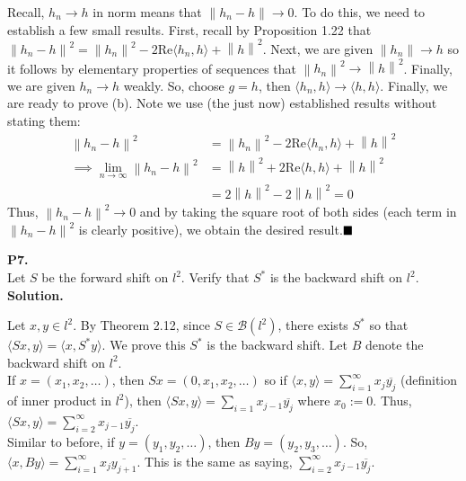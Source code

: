 \documentclass{article}
\newcommand{\norm}[1]{\left\lVert#1\right\rVert}
\begin{document}
    Recall, $h_n\to h$ in norm means that $\norm{h_n-h}\to 0$. To do this, we need to establish a few small results. First, recall
    by Proposition 1.22 that $\norm{h_n-h}^2 = \norm{h_n}^2 - 2\text{Re}\langle h_n,h\rangle + \norm{h}^2$. Next,
    we are given $\norm{h_n} \to h$ so it follows by elementary properties of sequences that $\norm{h_n}^2 \to \norm{h}^2$.
    Finally, we are given $h_n\to h$ weakly. So, choose $g = h$, then $\langle h_n,h\rangle \to \langle h,h\rangle$. Finally,
    we are ready to prove (b). Note we use (the just now) established results without stating them:
    \begin{align*}
        \norm{h_n-h}^2 &= \norm{h_n}^2 - 2\text{Re}\langle h_n,h\rangle + \norm{h}^2 \\
            \implies \lim_{n\to\infty} \norm{h_n-h}^2 &= \norm{h}^2 + 2\text{Re}\langle h,h\rangle + \norm{h}^2 \\
            &= 2\norm{h}^2 - 2\norm{h}^2 = 0
    \end{align*}
    Thus, $\norm{h_n-h}^2\to 0$ and by taking the square root of both sides (each term in $\norm{h_n-h}^2$ is clearly positive),
    we obtain the desired result.$\hfill\blacksquare$

    \newpage

    \textbf{P7.}\\

    Let $S$ be the forward shift on $l^2$. Verify that $S^*$ is the backward shift on $l^2$.\\

    \textbf{Solution.}

    Let $x,y\in l^2$. By Theorem 2.12, since $S\in\mathcal{B}(l^2)$, there exists $S^*$ so that $\langle Sx,y\rangle =
    \langle x,S^* y\rangle$. We prove this $S^*$ is the backward shift. Let $B$ denote the backward shift on $l^2$.\\

    If $x = (x_1,x_2,\hdots)$, then $Sx = (0,x_1,x_2,\hdots)$ so if $\langle x,y\rangle = \sum_{i=1}^{\infty} x_j\overline{y_j}$
    (definition of inner product in $l^2$), then $\langle Sx,y\rangle = \sum_{i=1} x_{j-1}\overline{y_j}$ where $x_0 := 0$. Thus,
    $\langle Sx,y\rangle = \sum_{i=2}^{\infty} x_{j-1}\overline{y_j}$.\\

    Similar to before, if $y = (y_1,y_2,\hdots)$, then $By = (y_2,y_3,\hdots)$. So, $\langle x,By\rangle = 
    \sum_{i=1}^{\infty}x_j\overline{y_{j+1}}$. This is the same as saying, $\sum_{i=2}^{\infty} x_{j-1}\overline{y_j}$.\\
\end{document}
